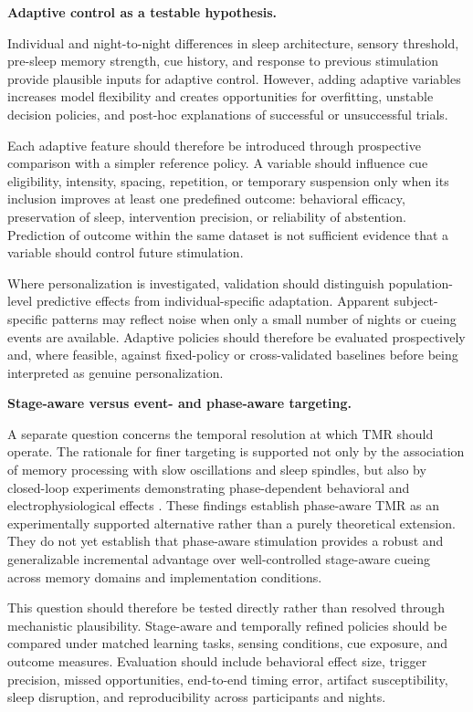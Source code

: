 \noindent\textbf{Adaptive control as a testable hypothesis.}

Individual and night-to-night differences in sleep architecture, sensory
threshold, pre-sleep memory strength, cue history, and response to previous
stimulation provide plausible inputs for adaptive control. However, adding
adaptive variables increases model flexibility and creates opportunities for
overfitting, unstable decision policies, and post-hoc explanations of
successful or unsuccessful trials.

Each adaptive feature should therefore be introduced through prospective
comparison with a simpler reference policy. A variable should influence cue
eligibility, intensity, spacing, repetition, or temporary suspension only when
its inclusion improves at least one predefined outcome: behavioral efficacy,
preservation of sleep, intervention precision, or reliability of abstention.
Prediction of outcome within the same dataset is not sufficient evidence that a
variable should control future stimulation.

Where personalization is investigated, validation should distinguish
population-level predictive effects from individual-specific adaptation.
Apparent subject-specific patterns may reflect noise when only a small number of
nights or cueing events are available. Adaptive policies should therefore be
evaluated prospectively and, where feasible, against fixed-policy or
cross-validated baselines before being interpreted as genuine personalization.

\noindent\textbf{Stage-aware versus event- and phase-aware targeting.}

A separate question concerns the temporal resolution at which TMR should
operate. The rationale for finer targeting is supported not only by the
association of memory processing with slow oscillations and sleep spindles, but
also by closed-loop experiments demonstrating phase-dependent behavioral and
electrophysiological effects
\citep{staresina2015nesting,cairney2018spindle,antony2018spindle,
shimizu2018closedloop,ngo2022shaping,nicolas2025phase}.
These findings establish phase-aware TMR as an experimentally supported
alternative rather than a purely theoretical extension. They do not yet
establish that phase-aware stimulation provides a robust and generalizable
incremental advantage over well-controlled stage-aware cueing across memory
domains and implementation conditions.

This question should therefore be tested directly rather than resolved through
mechanistic plausibility. Stage-aware and temporally refined policies should be
compared under matched learning tasks, sensing conditions, cue exposure, and
outcome measures. Evaluation should include behavioral effect size, trigger
precision, missed opportunities, end-to-end timing error, artifact
susceptibility, sleep disruption, and reproducibility across participants and
nights.

